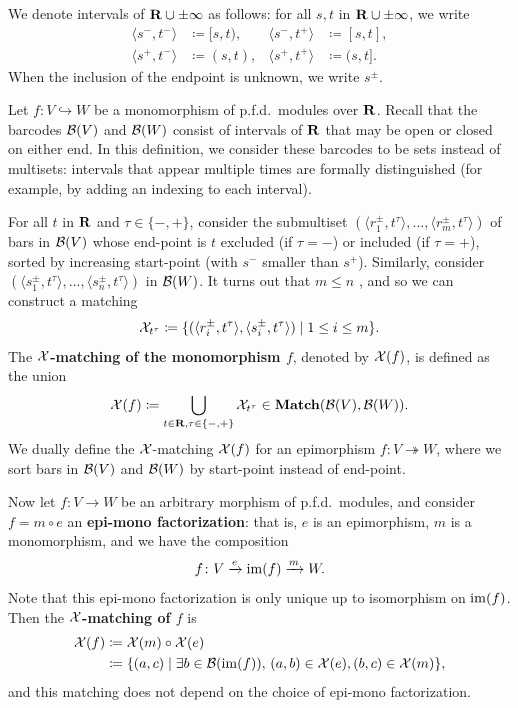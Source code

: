 \begin{notation}
  We denote intervals of $\mathbf{R} \cup \pm\infty$ as follows: for all $s, t$ in $\mathbf{R} \cup \pm\infty$, we write
  \begin{align*}
    \langle s^-, t^- \rangle & \coloneq [s, t), & \langle s^-, t^+ \rangle & \coloneq [s, t], \\
    \langle s^+, t^- \rangle & \coloneq (s, t), & \langle s^+, t^+ \rangle & \coloneq (s, t].
  \end{align*}
  When the inclusion of the endpoint is unknown, we write $s^\pm$.
\end{notation}

\begin{definition}
  Let $f \colon V \hookrightarrow W$ be a monomorphism of p.f.d.\ modules over $\mathbf{R}$. Recall that the barcodes $\mathcal{B}(V)$ and $\mathcal{B}(W)$ consist of intervals of $\mathbf{R}$ that may be open or closed on either end. In this definition, we consider these barcodes to be sets instead of multisets: intervals that appear multiple times are formally distinguished (for example, by adding an indexing to each interval).
  
  For all $t$ in $\mathbf{R}$ and $\tau \in \{-, +\}$, consider the submultiset $(\langle r_1^\pm, t^\tau \rangle, ..., \langle r_m^\pm, t^\tau \rangle)$ of bars in $\mathcal{B}(V)$ whose end-point is $t$ excluded (if $\tau = -$) or included (if $\tau = +$), sorted by increasing start-point (with $s^-$ smaller than $s^+$). Similarly, consider $(\langle s_1^\pm, t^\tau \rangle, ..., \langle s_n^\pm, t^\tau \rangle)$ in $\mathcal{B}(W)$. It turns out that $m \leq n$ \cite[Theorem 4.2]{BauerLesnick2015}, and so we can construct a matching
  \[
    \mathcal{X}_{t^\tau} \coloneq \{(\langle r_i^\pm, t^\tau \rangle, \langle s_i^\pm, t^\tau \rangle) \mid 1 \leq i \leq m \}.
  \]
  The \textbf{$\mathcal{X}$-matching of the monomorphism $f$}, denoted by $\mathcal{X}(f)$, is defined as the union
  \[
    \mathcal{X}(f) \coloneq \bigcup_{t \in \mathbf{R}, \tau \in \{-, +\}} \mathcal{X}_{t^\tau}  \in \operatorname{\mathbf{Match}}(\mathcal{B}(V), \mathcal{B}(W)).
  \]
  We dually define the $\mathcal{X}$-matching $\mathcal{X}(f)$ for an epimorphism $f \colon V \twoheadrightarrow W$, where we sort bars in $\mathcal{B}(V)$ and $\mathcal{B}(W)$ by start-point instead of end-point.
  
  Now let $f \colon V \to W$ be an arbitrary morphism of p.f.d.\ modules, and consider $f = m \circ e$ an \textbf{epi-mono factorization}: that is, $e$ is an epimorphism, $m$ is a monomorphism, and we have the composition
  \[
    f \colon V \xrightarrow{e} \operatorname{im}(f) \xrightarrow{m} W.
  \]
  Note that this epi-mono factorization is only unique up to isomorphism on $\operatorname{im}(f)$. Then the \textbf{$\mathcal{X}$-matching of $f$} is
  \begin{align*}
    \mathcal{X}(f) & \coloneq \mathcal{X}(m) \circ \mathcal{X}(e) \\
    & \coloneq \{(a, c) \mid \exists b \in \mathcal{B}(\operatorname{im}(f)), \, (a, b) \in \mathcal{X}(e), (b, c) \in \mathcal{X}(m)\},
  \end{align*}
  and this matching does not depend on the choice of epi-mono factorization.
\end{definition}

